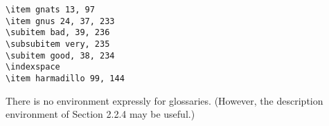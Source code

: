 \documentclass{article}
\begin{document}
\begin{verbatim}
\item gnats 13, 97
\item gnus 24, 37, 233
\subitem bad, 39, 236
\subsubitem very, 235
\subitem good, 38, 234
\indexspace
\item harmadillo 99, 144
\end{verbatim}

There is no environment expressly for glossaries. (However, the description environment of Section
2.2.4 may be useful.)

\end{document}
